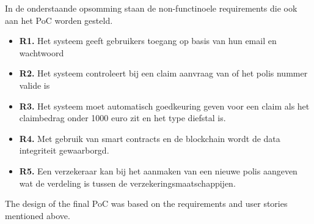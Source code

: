 In de onderstaande opsomming staan de non-functinoele requirements die ook aan het PoC worden gesteld.
\begin{itemize}
  \item \textbf{R1.} Het systeem geeft gebruikers toegang op basis van hun email en wachtwoord
  \item \textbf{R2.} Het systeem controleert bij een claim aanvraag van of het polis nummer valide is
  \item \textbf{R3.} Het systeem moet automatisch goedkeuring geven voor een claim als het claimbedrag onder 1000 euro zit en het type diefstal is.
  \item \textbf{R4.} Met gebruik van smart contracts en de blockchain wordt de data integriteit gewaarborgd.
  \item \textbf{R5.} Een verzekeraar kan bij het aanmaken van een nieuwe polis aangeven wat de verdeling is tussen de verzekeringsmaatschappijen.
\end{itemize}

The design of the final PoC was based on the requirements and user stories mentioned above.